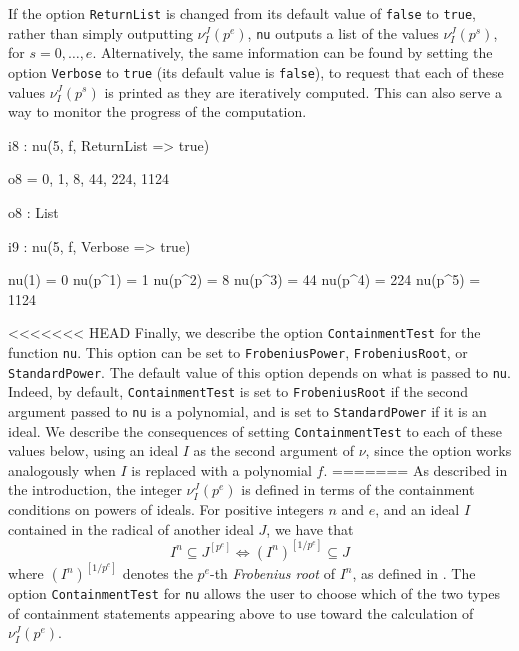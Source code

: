 \documentclass{amsart}
\begin{document}


If the option {\tt ReturnList} is changed from its default value of {\tt false} to {\tt true}, rather than simply outputting $\nu_I^J(p^e)$, {\tt nu} outputs a list of the values $\nu_I^J(p^s)$, for $s=0,\ldots,e$.
Alternatively, the same information can be found by setting the option {\tt Verbose} to {\tt true} (its default value is {\tt false}), to request that each of these values $\nu_I^J(p^s)$ is printed as they are iteratively computed.  This can also serve a way to monitor the progress of the computation.


{\small
{}
\begin{MyVerbatim}

i8 : nu(5, f, ReturnList => true)

o8 = {0, 1, 8, 44, 224, 1124}

o8 : List

i9 : nu(5, f, Verbose => true)

     nu(1) = 0
     nu(p^1) = 1
     nu(p^2) = 8
     nu(p^3) = 44
     nu(p^4) = 224
     nu(p^5) = 1124
\end{MyVerbatim}
}
\medspace


<<<<<<< HEAD
Finally, we describe the option {\tt ContainmentTest} for the function {\tt nu}.
This option can be set to {\tt FrobeniusPower}, {\tt FrobeniusRoot}, or {\tt StandardPower}. The default value of this option depends on what is passed to {\tt nu}. Indeed, by default, {\tt ContainmentTest} is set to {\tt FrobeniusRoot} if the second argument passed to {\tt nu} is a polynomial, and is set to {\tt StandardPower} if it is an ideal.  We describe the consequences of setting {\tt ContainmentTest} to each of these values below, using an ideal $I$ as the second argument of $\nu$, since the option works analogously when $I$ is replaced with a polynomial $f$.
=======
As described in the introduction, the integer $\nu_I^J(p^e)$ is defined in terms of the containment conditions on powers of ideals. 
For positive integers $n$ and $e$, and an ideal $I$ contained in the radical of another ideal $J$, we have that 
\begin{equation*}
  I^n \subseteq J^{[p^e]} \Longleftrightarrow (I^n)^{[1/p^e]} \subseteq J 
\end{equation*}
where $(I^n)^{[1/p^e]}$ denotes the $p^e$-th \emph{Frobenius root} of $I^n$, as defined in \cite{BlickleMustataSmithDiscretenessAndRationalityOfFThresholds}.
The option {\tt ContainmentTest} for {\tt nu} allows the user to choose which of the two types of containment statements appearing above to use toward the calculation of $\nu_I^J(p^e)$.
\end{document}
